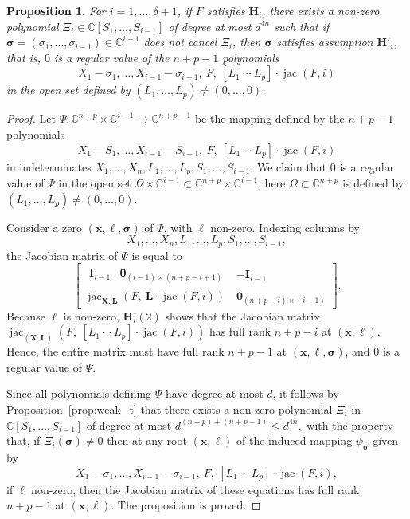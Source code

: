 \documentclass[12pt]{article}
\def\bz{{{\bm 0}}}
\def\xb{{\bm x}}
\DeclareMathOperator{\jac}{jac}
\def\C{\mathbb{C}}
\newtheorem{prop}[theorem]{Proposition}
\begin{document}
\begin{prop}\label{prop:hi2}
 For $i=1,\dots,\delta+1$, if $F$ satisfies $\bm H_i$, there exists a
 non-zero polynomial $\Xi_{i} \in \C[S_1,\dots,S_{i-1}]$ of degree at
 most $d^{4n}$ such that if $ \bm \sigma =
 (\sigma_1,\hdots,\sigma_{i-1}) \in \C^{i-1}$ does not cancel
 $\Xi_{i}$, then $\bm \sigma$ satisfies assumption $\bm H'_i$, that
 is, $0$ is a regular value of the $n+p-1$ polynomials
  \[ X_1-\sigma_1,\dots,X_{i-1}-\sigma_{i-1},\ F,\ [L_1~\cdots~L_p]\cdot \jac(F, i)\]
  in the open set defined by $(L_1,\dots,L_p) \ne (0,\dots,0)$.
\end{prop}
\begin{proof}
  Let $\Psi: \C^{n+p} \times \C^{i-1} \rightarrow
  \C^{n+p-1}$ be the mapping defined by the $n+p-1$ polynomials
  \[
  X_1 - S_1, \dots, X_{i-1} - S_{i-1},\ F,\ [L_1~\cdots~L_p]\cdot \jac(F, i)
  \]
  in indeterminates $X_1,\dots,X_n,L_1,\hdots,L_p,S_1,\dots,S_{i-1}$.
  We claim that $0$ is a regular value of $\Psi$ in the open set $\Omega
  \times \C^{i-1} \subset \C^{n+p} \times \C^{i-1}$, here $\Omega
  \subset \C^{n+p}$ is defined by $(L_1,\dots,L_p) \ne (0,\dots,0)$.
  
  Consider a zero $(\xb,\bm \ell,\bm \sigma)$ of $\Psi$, with $\bm \ell$
  non-zero. Indexing columns by
  \[
  X_1,\dots,X_n,L_1,\hdots,L_p,S_1,\dots,S_{i-1},
  \]
  the Jacobian matrix of $\Psi$ is equal to
  \[
  \left[ 
    \begin{array}{cc}
      \begin{array}{cc}
        \bm I_{i-1}     & \bz_{(i-1)\times (n+p-i+1)}  
      \end{array}  &-\bm I_{i-1}\\
      \jac_{\bm X,\bm L}\left( F,\ \bm L \cdot \jac (F,i)  \right) & \bz_{(n+p-i)\times (i-1)}
    \end{array}
    \right].
  \]
  Because $\bm \ell$ is non-zero, $\bm H_i(2)$ shows that the Jacobian
  matrix $\jac_{(\bm X,\bm L)}\left(F,\ [L_1~\cdots~L_p] \cdot \jac
  (F,i) \right)$ has full rank $n+p-i$ at $(\xb,\bm \ell)$. Hence, the
  entire matrix must have full rank $n+p-1$ at $(\xb,\bm \ell,\bm
  \sigma)$, and $0$ is a regular value of $\Psi$.
  
  Since all polynomials defining $\Psi$ have degree at most $d$, it
  follows by Proposition~\ref{prop:weak_t} that there exists a non-zero
  polynomial $\Xi_{i}$ in $\C[S_1,\dots,S_{i-1}]$ of degree at most
  $d^{(n+p)+(n+p-1)}\leq d^{4n},$ with the property that, if $\Xi_{i}(\bm
  \sigma)\neq 0$ then at any root $(\xb,\bm\ell)$ of the induced 
  mapping $\psi_{\bm\sigma}$ given by
  \begin{equation}\label{eqdef:fiber}
    X_1-\sigma_1,\dots,X_{i-1}-\sigma_{i-1},\ F,\ [L_1~\cdots~L_p]\cdot \jac(F, i),  
  \end{equation}
  if $\bm \ell$ non-zero, then the Jacobian matrix of these equations
  has full rank $n+p-1$ at $(\xb,\bm\ell)$. The proposition is proved.
\end{proof}
\end{document}
